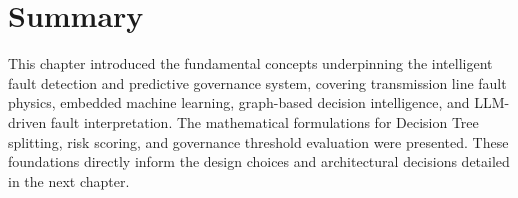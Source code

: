 \section{Summary}

This chapter introduced the fundamental concepts underpinning the intelligent fault detection and predictive governance system, covering transmission line fault physics, embedded machine learning, graph-based decision intelligence, and LLM-driven fault interpretation. The mathematical formulations for Decision Tree splitting, risk scoring, and governance threshold evaluation were presented. These foundations directly inform the design choices and architectural decisions detailed in the next chapter.
